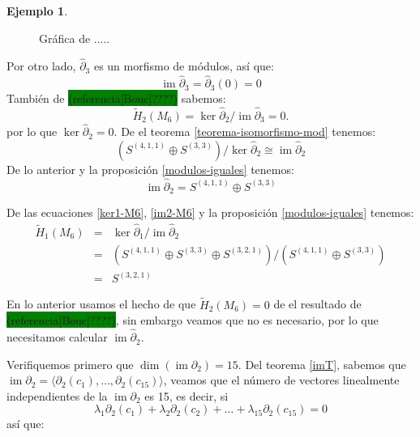 \documentclass[12pt]{book}
\theoremstyle{definition}
\newtheorem{example}[theorem]{Ejemplo}
\DeclareMathOperator{\im}{im}
\newcounter{in}
\newcounter{ini}
\begin{document}
\begin{example}
\begin{figure}[h]
\begin{center}
\begin{minipage}{0.45\linewidth}
      \caption{Gráfica de .....}
      \label{grafica-contraible-M6}
    \end{minipage}
  \end{center}
\end{figure}

Por otro lado, $\widehat\partial_{3}$ es un morfismo de módulos, así que:
\begin{equation*}
\im\widehat\partial_{3}=\widehat\partial_{3}(0)=0
\label{im3-KM5}
\end{equation*}
También de
\setlength{\fboxsep}{0pt}\colorbox{green}{(referencia[Bouc]????)} sabemos:
\begin{equation*}
\widetilde H_{2}(M_{6})=\ker \widehat\partial_{2}/\im \widehat\partial_{3}=0.
\end{equation*}
por lo que $\ker \widehat\partial_{2}=0$. De el teorema
\ref{teorema-isomorfismo-mod} tenemos:
$$(S^{(4,1,1)}\oplus S^{(3,3)})/\ker \widehat\partial_{2}\cong \im \widehat\partial_{2}$$
De lo anterior y la proposición \ref{modulos-iguales} tenemos:
\begin{equation}
\im \widehat\partial_{2}=S^{(4,1,1)}\oplus S^{(3,3)}
\label{im2-M6}
\end{equation}

De las ecuaciones \ref{ker1-M6}, \ref{im2-M6} y la proposición
\ref{modulos-iguales} tenemos:
\begin{eqnarray*}
  \widetilde H_{1}(M_{6})&=&\ker \widehat\partial_{1}/\im
  \widehat\partial_{2}\\
  &=&(S^{(4,1,1)}\oplus S^{(3,3)}\oplus
  S^{(3,2,1)})/(S^{(4,1,1)}\oplus S^{(3,3)})\\
  &=&S^{(3,2,1)}
\end{eqnarray*}

En lo anterior usamos el hecho de que $\widetilde H_{2}(M_{6})=0$ de el
resultado de \setlength{\fboxsep}{0pt}\colorbox{green}{(referencia[Bouc]????)}, sin embargo veamos que no es necesario, por lo que
necesitamos calcular $\im \widehat\partial_{2}$. 

Verifiquemos primero que $\dim(\im \partial_{2})=15$. Del teorema
\ref{imT}, sabemos que $\im \partial_{2}=\langle\partial_{2}(c_{1}),\ldots,\partial_{2}(c_{15})\rangle$,
veamos que el número de vectores linealmente independientes de la
$\im \partial_{2}$ es 15, es decir, si
$$\lambda_{1}\partial_{2}(c_{1})+\lambda_{2}\partial_{2}(c_{2})+\ldots+\lambda_{15}\partial_{2}(c_{15})=0$$
así que:


\end{example}
\end{document}
